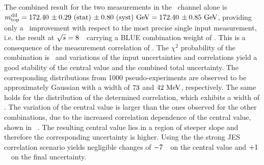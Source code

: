 The combined result for the two measurements in the \dil\ channel alone is $m_{\mathrm{top}}^{\mathrm{dil}} = 172.40\,\pm 0.29~\mathrm{(stat)}\,\pm 0.80~\mathrm{(syst)}~\mathrm{GeV} = 172.40\,\pm 0.85~\mathrm{GeV}$, providing only a \CombImprovementDL\ improvement with respect to the most precise single input measurement, i.e. the result at ${\sqrt{s}}=8$~\TeV\ carrying a \gls{BLUE} combination weight of \CombWeightDLeightDL. This is a consequence of the measurement correlation of \CorrDil. The $\chi^2$ probability of the combination is \CombChiSqProbDL\ and variations of the input uncertainties and correlations yield a good stability of the central value and the combined total uncertainty. The corresponding distributions from 1000 pseudo-experiments are observed to be approximately Gaussian with a width of $73$ and $42~\mathrm{MeV}$, respectively. 
%
The same holds for the distribution of the determined correlation, which exhibits a width of \CorrDilUnc. 
%
The variation of the central value is larger than the ones observed for the other combinations, due to the increased correlation dependence of the central value, shown in \fig~. The resulting central value lies in a region of steeper slope and therefore the corresponding uncertainty is higher.
%
Using the the strong \gls{JES} correlation scenario yields negligible changes of $-7$~\MeV\ on the central value and $+1$~\MeV\ on the final uncertainty.
%
